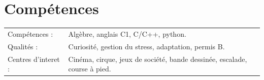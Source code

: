 \documentclass[a4paper,12pt]{article}
\begin{document}

\section{Compétences}
\begin{tabularx}{\linewidth}{@{}l X@{}}
Compétences : &  \normalsize{Algèbre, anglais C1, C/C++, python.}\\
Qualités : &  \normalsize{Curiosité, gestion du stress, adaptation, permis B.}\\
Centres d'interet :  &  \normalsize{Cinéma, cirque, jeux de société, bande dessinée, escalade, course à pied.}\\  
\end{tabularx}

\vfill
{}
\end{document}
